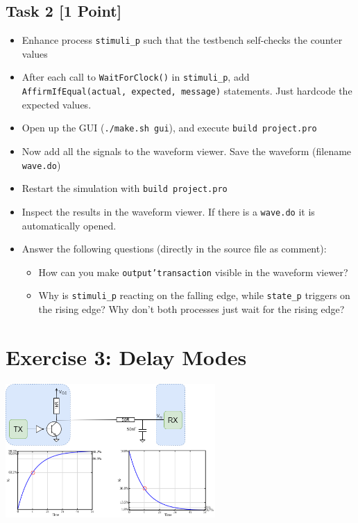 \documentclass[12pt,epsf,makeidx,oneside]{book}
\begin{document}
\subsection{Task 2 [1 Point]}
\begin{itemize}[noitemsep]
  \item Enhance process {\tt stimuli\_p} such that the testbench self-checks the counter values
  \item After each call to {\tt WaitForClock()} in {\tt stimuli\_p}, add {\tt AffirmIfEqual(actual, expected, message)} statements. Just hardcode the expected values.
  \item Open up the GUI ({\tt ./make.sh gui}), and execute {\tt build project.pro}
  \item Now add all the signals to the waveform viewer. Save the waveform (filename {\tt wave.do})
  \item Restart the simulation with {\tt build project.pro}
  \item Inspect the results in the waveform viewer. If there is a {\tt wave.do} it is automatically opened.
  \item Answer the following questions (directly in the source file as comment):
  \begin{itemize}[noitemsep]
    \item How can you make {\tt output'transaction} visible in the waveform viewer?
    \item Why is {\tt stimuli\_p} reacting on the falling edge, while {\tt state\_p} triggers on the rising edge? Why don't both processes just wait for the rising edge?
  \end{itemize}
\end{itemize}

\section{Exercise 3: Delay Modes}
\begin{center}
  \includegraphics[width=0.6\textwidth]{transmission}
\end{center}
\end{document}
